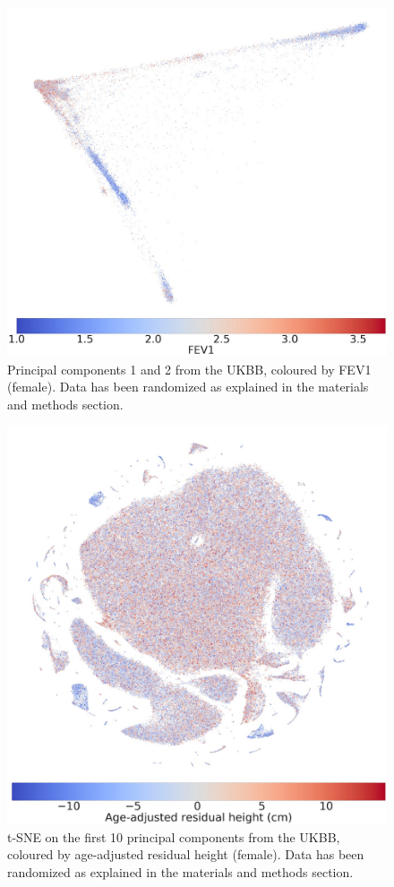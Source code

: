 \documentclass[12pt]{pnas-new}
\begin{document}
\begin{figure}
    \centering
    \includegraphics[width=0.4\columnwidth]{images/ukbb_pcs_201941019249_3063_0_0_pct1_f.jpeg}
    \caption{Principal components 1 and 2 from the UKBB, coloured by FEV1 (female). Data has been randomized as explained in the materials and methods section.}
    \label{fig:supp_ukbb_pca_fev_f}
\end{figure}


\clearpage
\begin{figure}
    \centering
    \includegraphics[width=0.4\columnwidth]{images/UKBB_TSNE_10PCs_DefaultPerplexity_2019410184913_Height_res_pct1_f.jpeg}
    \caption{t-SNE on the first 10 principal components from the UKBB, coloured by age-adjusted residual height (female). Data has been randomized as explained in the materials and methods section.}
    \label{fig:supp_ukbb_tsne_height_res_f}
\end{figure}
\end{document}
